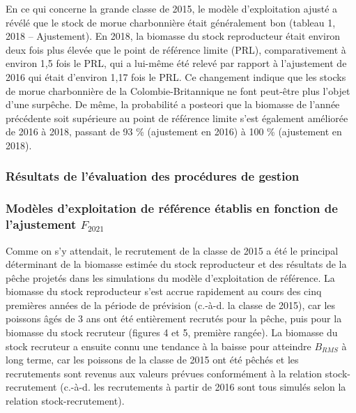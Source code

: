 \documentclass[11pt]{book}
\begin{document}
En ce qui concerne la grande classe de 2015, le modèle d'exploitation ajusté a révélé que le stock de morue charbonnière était généralement bon (tableau 1, 2018 -- Ajustement). En 2018, la biomasse du stock reproducteur était environ deux fois plus élevée que le point de référence limite (PRL), comparativement à environ 1,5 fois le PRL, qui a lui-même été relevé par rapport à l'ajustement de 2016 qui était d'environ 1,17 fois le PRL. Ce changement indique que les stocks de morue charbonnière de la Colombie-Britannique ne font peut-être plus l'objet d'une surpêche. De même, la probabilité a posteori que la biomasse de l'année précédente soit supérieure au point de référence limite s'est également améliorée de 2016 à 2018, passant de 93 \% (ajustement en 2016) à 100 \% (ajustement en 2018).

\hypertarget{ruxe9sultats-de-luxe9valuation-des-procuxe9dures-de-gestion}{%
\subsubsection{Résultats de l'évaluation des procédures de gestion}\label{ruxe9sultats-de-luxe9valuation-des-procuxe9dures-de-gestion}}

\hypertarget{moduxe8les-dexploitation-de-ruxe9fuxe9rence-uxe9tablis-en-fonction-de-lajustement-f_2021}{%
\subsubsection{\texorpdfstring{Modèles d'exploitation de référence établis en fonction de l'ajustement \(F_{2021}\)}{Modèles d'exploitation de référence établis en fonction de l'ajustement F\_\{2021\}}}\label{moduxe8les-dexploitation-de-ruxe9fuxe9rence-uxe9tablis-en-fonction-de-lajustement-f_2021}}

Comme on s'y attendait, le recrutement de la classe de 2015 a été le principal déterminant de la biomasse estimée du stock reproducteur et des résultats de la pêche projetés dans les simulations du modèle d'exploitation de référence. La biomasse du stock reproducteur s'est accrue rapidement au cours des cinq premières années de la période de prévision (c.-à-d. la classe de 2015), car les poissons âgés de 3 ans ont été entièrement recrutés pour la pêche, puis pour la biomasse du stock recruteur (figures 4 et 5, première rangée). La biomasse du stock recruteur a ensuite connu une tendance à la baisse pour atteindre \(B_{RMS}\) à long terme, car les poissons de la classe de 2015 ont été pêchés et les recrutements sont revenus aux valeurs prévues conformément à la relation stock-recrutement (c.-à-d. les recrutements à partir de 2016 sont tous simulés selon la relation stock-recrutement).
\end{document}
